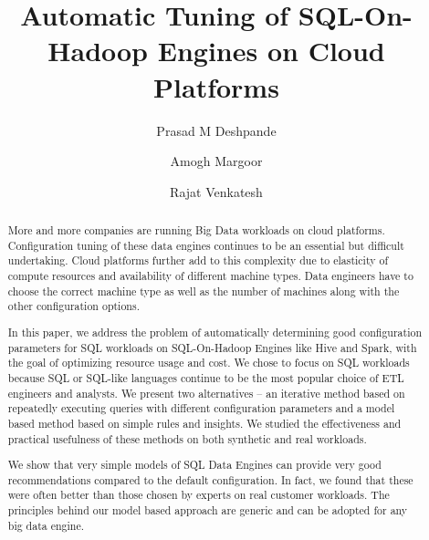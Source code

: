 \documentclass[sigconf]{acmart}
\newcommand{\eat}[1]{}
\begin{document}
\title{Automatic Tuning of SQL-On-Hadoop Engines on Cloud Platforms}

\author{Prasad M Deshpande}

\author{Amogh Margoor}

\author{Rajat Venkatesh}

\renewcommand{\shortauthors}{P. Deshpande et al.}


\begin{abstract}
More and more companies are running Big Data workloads on cloud platforms. Configuration tuning of these data engines continues to be an essential but difficult undertaking. Cloud platforms further add to this complexity due to elasticity of compute resources and availability of different machine types. Data engineers have to choose the correct machine type as well as the number of machines along with the other configuration options.

In this paper, we address the problem of automatically determining good configuration parameters for SQL workloads on SQL-On-Hadoop Engines like Hive and Spark, with the goal of optimizing resource usage and cost. We chose to focus on SQL workloads because SQL or SQL-like languages continue to be the most popular choice of ETL engineers and analysts. We present two alternatives -- an iterative method based on repeatedly executing queries with different configuration parameters and a model based method based on simple rules and insights. We studied the effectiveness and practical usefulness of these methods on both synthetic and real workloads.

We show that very simple models of SQL Data Engines can provide very good recommendations compared to the default configuration. In fact, we found that these were often better than those chosen by experts on real customer workloads.  The principles behind our model based approach are generic and can be adopted for any big data engine. 
\end{abstract}
\eat{
\begin{CCSXML}
<ccs2012>
<concept>
<concept_id>10002951.10002952.10003190.10003195.10010837</concept_id>
<concept_desc>Information systems~MapReduce-based systems</concept_desc>
<concept_significance>500</concept_significance>
</concept>
<concept>
<concept_id>10002951.10002952.10003190.10003195.10010838</concept_id>
<concept_desc>Information systems~Relational parallel and distributed DBMSs</concept_desc>
<concept_significance>500</concept_significance>
</concept>
<concept>
<concept_id>10002951.10002952.10003212.10003216</concept_id>
<concept_desc>Information systems~Autonomous database administration</concept_desc>
<concept_significance>500</concept_significance>
</concept>
</ccs2012>
\end{CCSXML}
}
\end{document}

